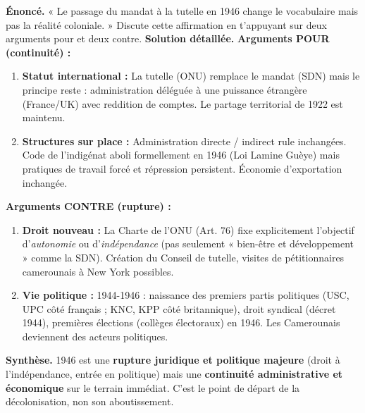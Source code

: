 \documentclass[11pt]{article}
\begin{document}
\begin{exoresolu}
\textbf{Énoncé.} « Le passage du mandat à la tutelle en 1946 change le vocabulaire mais pas la réalité coloniale. » Discute cette affirmation en t'appuyant sur deux arguments pour et deux contre.
\tcblower
\textbf{Solution détaillée.}
\textbf{Arguments POUR (continuité) :}
\begin{enumerate}
\item \textbf{Statut international :} La tutelle (ONU) remplace le mandat (SDN) mais le principe reste : administration déléguée à une puissance étrangère (France/UK) avec reddition de comptes. Le partage territorial de 1922 est maintenu.
\item \textbf{Structures sur place :} Administration directe / indirect rule inchangées. Code de l'indigénat aboli formellement en 1946 (Loi Lamine Guèye) mais pratiques de travail forcé et répression persistent. Économie d'exportation inchangée.
\end{enumerate}
\textbf{Arguments CONTRE (rupture) :}
\begin{enumerate}
\item \textbf{Droit nouveau :} La Charte de l'ONU (Art. 76) fixe explicitement l'objectif d'\emph{autonomie} ou d'\emph{indépendance} (pas seulement « bien-être et développement » comme la SDN). Création du Conseil de tutelle, visites de pétitionnaires camerounais à New York possibles.
\item \textbf{Vie politique :} 1944-1946 : naissance des premiers partis politiques (USC, UPC côté français ; KNC, KPP côté britannique), droit syndical (décret 1944), premières élections (collèges électoraux) en 1946. Les Camerounais deviennent des acteurs politiques.
\end{enumerate}
\textbf{Synthèse.} 1946 est une \textbf{rupture juridique et politique majeure} (droit à l'indépendance, entrée en politique) mais une \textbf{continuité administrative et économique} sur le terrain immédiat. C'est le point de départ de la décolonisation, non son aboutissement.
\end{exoresolu}
\end{document}
